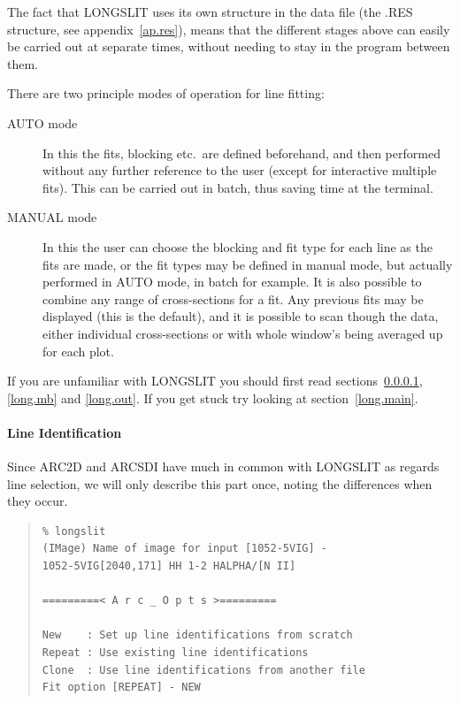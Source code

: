 \documentclass[11pt,twoside]{article}
\begin{document}
The fact that LONGSLIT uses its own structure in the data file (the
.RES structure, see appendix~\ref{ap.res}), means that the different
stages above can easily be carried out at separate times, without
needing to stay in the program between them.

There are two principle modes of operation for line fitting:

\begin{description}

\item[AUTO mode] In this the fits, blocking etc.\ are defined
beforehand, and then performed without any further reference to the
user (except for interactive multiple fits).
This can be carried out in batch, thus saving time at the terminal.

\item[MANUAL mode] In this the user can choose the blocking and fit
type for each line as the fits are made, or the fit types may be
defined in manual mode, but actually performed in AUTO mode, in batch
for example.
It is also possible to combine any range of cross-sections for a fit.
Any previous fits may be displayed (this is the default), and it is
possible to scan though the data, either individual cross-sections or
with whole window's being averaged up for each plot.

\end{description}

If you are unfamiliar with LONGSLIT you should first read
sections~\ref{long.id}, \ref{long.mb} and \ref{long.out}.
If you get stuck try looking at section~\ref{long.main}.

\paragraph{Line Identification}
\label{long.id}

Since ARC2D and ARCSDI have much in common with LONGSLIT as regards
line selection, we will only describe this part once, noting the
differences when they occur.

\begin{quote}\begin{verbatim}
% longslit
(IMage) Name of image for input [1052-5VIG] -
1052-5VIG[2040,171] HH 1-2 HALPHA/[N II]

=========< A r c _ O p t s >=========

New    : Set up line identifications from scratch
Repeat : Use existing line identifications
Clone  : Use line identifications from another file
Fit option [REPEAT] - NEW
\end{verbatim}\end{quote}
\end{document}
